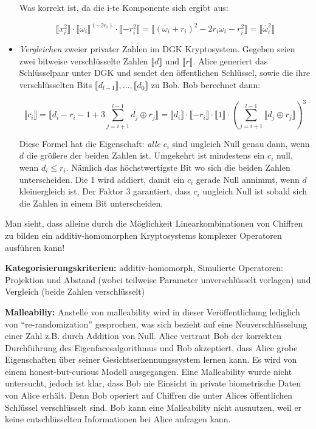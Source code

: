 \begin{itemize}
Was korrekt ist, da die i-te Komponente sich ergibt aus:

\begin{equation*}
\llbracket x_i^2 \rrbracket\cdot\llbracket\overline\omega_i\rrbracket^{(-2r_i)}\cdot\llbracket-r_i^2\rrbracket =
\llbracket (\overline\omega_i+r_i)^2-2r_i\overline\omega_i - r_i^2 \rrbracket = \llbracket\overline\omega_i^2 \rrbracket 
\end{equation*}

\item \textit{Vergleichen} zweier privater Zahlen im DGK Kryptosystem. Gegeben seien zwei bitweise verschlüsselte Zahlen $\llbracket d \rrbracket$ und $\llbracket r \rrbracket$. Alice generiert das Schlüsselpaar unter DGK und sendet den öffentlichen Schlüssel, sowie die ihre verschlüsselten Bits $\llbracket d_{l-1} \rrbracket,\ldots,\llbracket d_0 \rrbracket$ zu Bob. Bob berechnet dann:

\begin{equation*}
\llbracket c_i \rrbracket = \llbracket d_i-r_i-1+3\sum_{j=i+1}^{l-1} d_j\oplus r_j \rrbracket = 
\llbracket d_i \rrbracket \cdot \llbracket -r_i \rrbracket \cdot \llbracket 1 \rrbracket \cdot \left(\sum_{j=i+1}^{l-1} \llbracket d_j\oplus r_j \rrbracket \right)^3
\end{equation*}

Diese Formel hat die Eigenschaft: \textit{alle} $c_i$ sind ungleich Null genau dann, wenn $d$ die größere der beiden Zahlen ist. Umgekehrt ist mindestens ein $c_i$ null, wenn $d_i\leq r_i$. Nämlich das höchstwertigste Bit wo sich die beiden Zahlen unterscheiden. Die 1 wird addiert, damit ein $c_i$ gerade Null annimmt, wenn $d$ kleinergleich ist. Der Faktor 3 garantiert, dass $c_i$ ungleich Null ist sobald sich die Zahlen in einem Bit unterscheiden.

\end{itemize}

Man sieht, dass alleine durch die Möglichkeit Linearkombinationen von Chiffren zu bilden ein additiv-homomorphen Kryptosystems komplexer Operatoren ausführen kann!

\textbf{Kategorisierungskriterien:} additiv-homomorph, Simulierte Operatoren: Projektion und Abstand (wobei teilweise Parameter unverschlüsselt vorlagen) und Vergleich (beide Zahlen verschlüsselt)

\textbf{Malleabiliy:} Anstelle von malleability wird in dieser Veröffentlichung lediglich von \enquote{re-randomization} gesprochen, was sich bezieht auf eine Neuverschlüsselung einer Zahl z.B. durch Addition von Null. Alice vertraut Bob der korrekten Durchführung des Eigenfacesalgorithmus und Bob akzeptiert, dass Alice grobe Eigenschaften über seiner Gesichtserkennungssystem lernen kann. Es wird von einem honest-but-curious Modell ausgegangen. Eine Malleability wurde nicht untersucht, jedoch ist klar, dass Bob nie Einsicht in  private biometrische Daten von Alice erhält. Denn Bob operiert  auf Chiffren die unter Alices öffentlichen Schlüssel verschlüsselt sind. Bob kann eine Malleability nicht ausnutzen, weil er keine entschlüsselten Informationen bei Alice anfragen kann.

